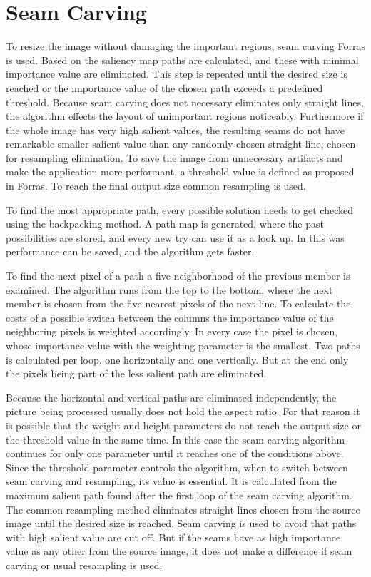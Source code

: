 \documentclass[draft,final]{vutinfth} %
\begin{document}
\section{Seam Carving}
To resize the image without damaging the important regions, seam carving Forras is used.
Based on the saliency map paths are calculated, and these with minimal importance value are eliminated.
This step is repeated until the desired size is reached or the importance value of the chosen path exceeds a predefined threshold.
Because seam carving does not necessary eliminates only straight lines, the algorithm effects the layout of unimportant regions noticeably.
Furthermore if the whole image has very high salient values, the resulting seams do not have remarkable smaller salient value than any randomly chosen straight line, chosen for resampling elimination.
To save the image from unnecessary artifacts and make the application more performant, a threshold value is defined as proposed in Forras.
To reach the final output size common resampling is used.\par 
To find the most appropriate path, every possible solution needs to get checked using the backpacking method.
A path map is generated, where the past possibilities are stored, and every new try can use it as a look up.
In this was performance can be saved, and the algorithm gets faster.\par 
To find the next pixel of a path a five-neighborhood of the previous member is examined.
The algorithm runs from the top to the bottom, where the next member is chosen from the five nearest pixels of the next line.
To calculate the costs of a possible switch between the columns the importance value of the neighboring pixels is weighted accordingly.
In every case the pixel is chosen, whose importance value with the weighting parameter is the smallest.
Two paths is calculated per loop, one horizontally and one vertically.
But at the end only the pixels being part of the less salient path are eliminated.\par 
Because the horizontal and vertical paths are eliminated independently, the picture being processed usually does not hold the aspect ratio.
For that reason it is possible that the weight and height parameters do not reach the output size or the threshold value in the same time.
In this case the seam carving algorithm continues for only one parameter until it reaches one of the conditions above. 
Since the threshold parameter controls the algorithm, when to switch between seam carving and resampling, its value is essential. 
It is calculated from the maximum salient path found after the first loop of the seam carving algorithm.
The common resampling method eliminates straight lines chosen from the source image until the desired size is reached.
Seam carving is used to avoid that paths with high salient value are cut off.
But if the seams have as high importance value as any other from the source image, it does not make a difference if seam carving or usual resampling is used.
\end{document}
